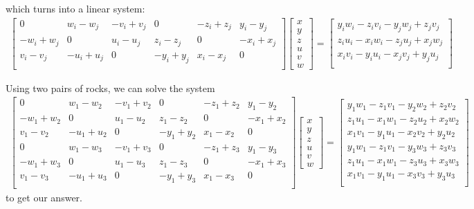 \documentclass{article}
\newcommand*\mat[1]{\begin{bmatrix}#1\end{bmatrix}}
\begin{document}
which turns into a linear system:
\begin{align*}
\mat{
0 & w_i-w_j & -v_i+v_j & 0 & -z_i+z_j & y_i-y_j\\
-w_i+w_j & 0 & u_i-u_j & z_i-z_j & 0 & -x_i+x_j\\
v_i-v_j & -u_i+u_j & 0 & -y_i+y_j & x_i-x_j & 0\\
}
\mat{x\\y\\z\\u\\v\\w}=
\mat{
y_iw_i-z_iv_i-y_jw_j+z_jv_j\\
z_iu_i-x_iw_i-z_ju_j+x_jw_j\\
x_iv_i-y_iu_i-x_jv_j+y_ju_j\\
}
\end{align*}

Using two pairs of rocks, we can solve the system
\begin{align*}
\mat{
0 & w_1-w_2 & -v_1+v_2 & 0 & -z_1+z_2 & y_1-y_2\\
-w_1+w_2 & 0 & u_1-u_2 & z_1-z_2 & 0 & -x_1+x_2\\
v_1-v_2 & -u_1+u_2 & 0 & -y_1+y_2 & x_1-x_2 & 0\\
0 & w_1-w_3 & -v_1+v_3 & 0 & -z_1+z_3 & y_1-y_3\\
-w_1+w_3 & 0 & u_1-u_3 & z_1-z_3 & 0 & -x_1+x_3\\
v_1-v_3 & -u_1+u_3 & 0 & -y_1+y_3 & x_1-x_3 & 0\\
}
\mat{x\\y\\z\\u\\v\\w}=
\mat{
y_1w_1-z_1v_1-y_2w_2+z_2v_2\\
z_1u_1-x_1w_1-z_2u_2+x_2w_2\\
x_1v_1-y_1u_1-x_2v_2+y_2u_2\\
y_1w_1-z_1v_1-y_3w_3+z_3v_3\\
z_1u_1-x_1w_1-z_3u_3+x_3w_3\\
x_1v_1-y_1u_1-x_3v_3+y_3u_3\\
}
\end{align*}
to get our answer.
\end{document}
